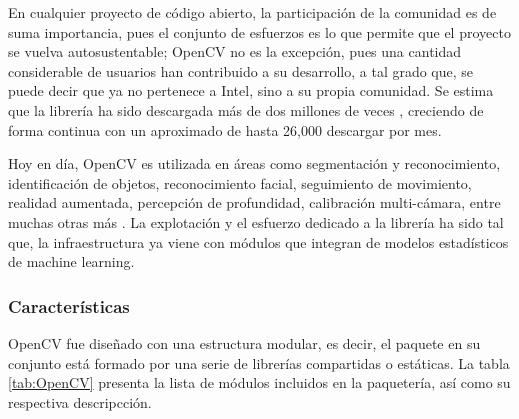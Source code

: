 En cualquier proyecto de código abierto, la participación de la comunidad es de suma importancia, pues el conjunto de esfuerzos es lo que permite que el proyecto se vuelva autosustentable; OpenCV no es la excepción, pues una cantidad considerable de usuarios han contribuido a su desarrollo, a tal grado que, se puede decir que ya no pertenece a Intel, sino a su propia comunidad. Se estima que la librería ha sido descargada más de dos millones de veces \cite{bradski2008learning}, creciendo de forma continua con un aproximado de hasta 26,000 descargar por mes. 

Hoy en día, OpenCV es utilizada en áreas como segmentación y reconocimiento, identificación de objetos, reconocimiento facial, seguimiento de movimiento, realidad aumentada, percepción de profundidad, calibración multi-cámara, entre muchas otras más \cite{garcia2015learning}. La explotación y el esfuerzo dedicado a la librería ha sido tal que, la infraestructura ya viene con módulos que integran de modelos estadísticos de machine learning.

\subsubsection{Características}
OpenCV fue diseñado con una estructura modular, es decir, el paquete en su conjunto está formado por una serie de librerías compartidas o estáticas. La tabla \ref{tab:OpenCV} presenta la lista de módulos incluidos en la paquetería, así como su respectiva descripcción.


